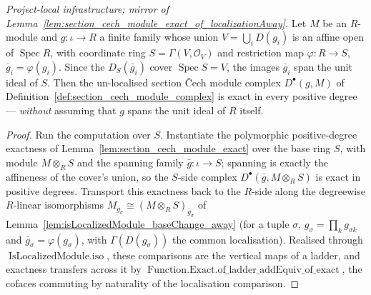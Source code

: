 \begin{lemma}
  \label{lem:section_cech_module_exact_of_affineCover}
  \textit{Project-local infrastructure; mirror of
  Lemma~\ref{lem:section_cech_module_exact_of_localizationAway}.}
  Let \(M\) be an \(R\)-module and \(g : \iota \to R\) a finite family whose union
  \(V = \bigcup_i D(g_i)\) is an affine open of \(\operatorname{Spec} R\), with coordinate ring
  \(S = \Gamma(V, \mathcal{O}_V)\) and restriction map \(\varphi : R \to S\), \(\bar g_i = \varphi(g_i)\).
  Since the \(D_S(\bar g_i)\) cover \(\operatorname{Spec} S = V\), the images \(\bar g_i\) span the unit
  ideal of \(S\). Then the un-localised section {\v C}ech module complex \(D^\bullet(g, M)\) of
  Definition~\ref{def:section_cech_module_complex} is exact in every positive degree --- \emph{without}
  assuming that \(g\) spans the unit ideal of \(R\) itself.
\end{lemma}
\begin{proof}
  Run the computation over \(S\). Instantiate the polymorphic positive-degree exactness of
  Lemma~\ref{lem:section_cech_module_exact} over the base ring \(S\), with module \(M \otimes_R S\) and
  the spanning family \(\bar g : \iota \to S\); spanning is exactly the affineness of the cover's union,
  so the \(S\)-side complex \(D^\bullet(\bar g, M \otimes_R S)\) is exact in positive degrees. Transport
  this exactness back to the \(R\)-side along the degreewise \(R\)-linear isomorphisms
  \(M_{g_\sigma} \cong (M \otimes_R S)_{\bar g_\sigma}\) of
  Lemma~\ref{lem:isLocalizedModule_baseChange_away} (for a tuple \(\sigma\),
  \(g_\sigma = \prod_k g_{\sigma k}\) and \(\bar g_\sigma = \varphi(g_\sigma)\), with
  \(\Gamma(D(g_\sigma))\) the common localisation). Realised through \(\operatorname{IsLocalizedModule.iso}\),
  these comparisons are the vertical maps of a ladder, and exactness transfers across it by
  \(\operatorname{Function.Exact.of\_ladder\_addEquiv\_of\_exact}\), the cofaces commuting by naturality
  of the localisation comparison.
\end{proof}

